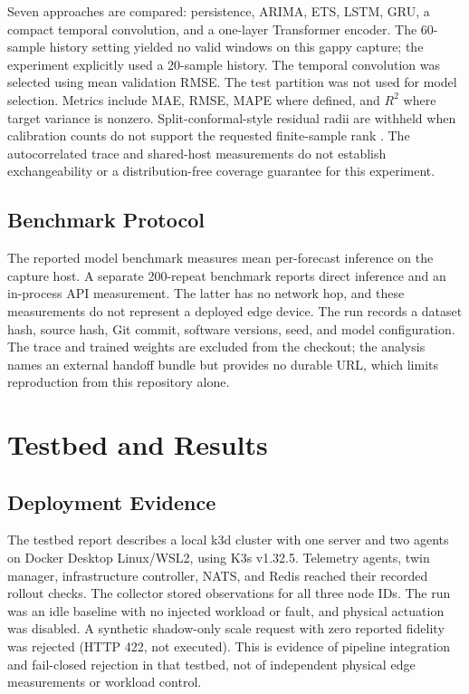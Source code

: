 \documentclass[conference]{IEEEtran}
\begin{document}
Seven approaches are compared: persistence, ARIMA, ETS, LSTM, GRU, a compact temporal convolution, and a one-layer Transformer encoder. The 60-sample history setting yielded no valid windows on this gappy capture; the experiment explicitly used a 20-sample history. The temporal convolution was selected using mean validation RMSE. The test partition was not used for model selection. Metrics include MAE, RMSE, MAPE where defined, and $R^2$ where target variance is nonzero. Split-conformal-style residual radii are withheld when calibration counts do not support the requested finite-sample rank \cite{angelopoulos2023}. The autocorrelated trace and shared-host measurements do not establish exchangeability or a distribution-free coverage guarantee for this experiment.

\subsection{Benchmark Protocol}
The reported model benchmark measures mean per-forecast inference on the capture host. A separate 200-repeat benchmark reports direct inference and an in-process API measurement. The latter has no network hop, and these measurements do not represent a deployed edge device. The run records a dataset hash, source hash, Git commit, software versions, seed, and model configuration. The trace and trained weights are excluded from the checkout; the analysis names an external handoff bundle but provides no durable URL, which limits reproduction from this repository alone.

\section{Testbed and Results}
\subsection{Deployment Evidence}
The testbed report describes a local k3d cluster with one server and two agents on Docker Desktop Linux/WSL2, using K3s v1.32.5. Telemetry agents, twin manager, infrastructure controller, NATS, and Redis reached their recorded rollout checks. The collector stored observations for all three node IDs. The run was an idle baseline with no injected workload or fault, and physical actuation was disabled. A synthetic shadow-only scale request with zero reported fidelity was rejected (HTTP 422, not executed). This is evidence of pipeline integration and fail-closed rejection in that testbed, not of independent physical edge measurements or workload control.
\end{document}
